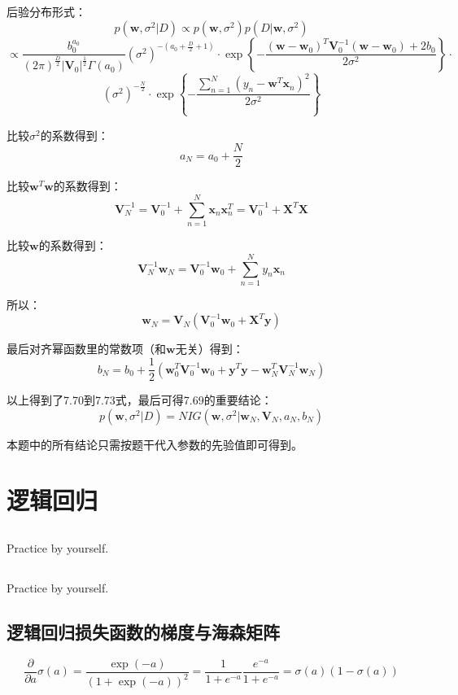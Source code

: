 \documentclass[UTF8]{ctexart}
\begin{document}
后验分布形式：
$$p(\textbf{w},\sigma^{2}|D) \propto p(\textbf{w},\sigma^{2})p(D|\textbf{w},\sigma^{2})$$
$$\propto \frac{b_{0}^{a_{0}}}{(2\pi)^{\frac{D}{2}}|\textbf{V}_{0}|^{\frac{1}{2}}\Gamma(a_{0})}(\sigma^{2})^{-(a_{0}+\frac{D}{2}+1)}\cdot\exp\left\{ -\frac{(\textbf{w}-\textbf{w}_{0})^{T}\textbf{V}_{0}^{-1}(\textbf{w}-\textbf{w}_{0})+2b_{0}}{2\sigma^{2}} \right\} \cdot$$
$$(\sigma^{2})^{-\frac{N}{2}}\cdot \exp\left\{ -\frac{\sum_{n=1}^{N}(y_{n}-\textbf{w}^{T}\textbf{x}_{n})^{2}}{2\sigma^{2}}  \right\}$$

比较$\sigma^{2}$的系数得到：
$$a_{N}=a_{0}+\frac{N}{2}$$

比较$\textbf{w}^{T}\textbf{w}$的系数得到：
$$\textbf{V}_{N}^{-1}=\textbf{V}_{0}^{-1}+\sum_{n=1}^{N}\textbf{x}_{n}\textbf{x}_{n}^{T}=\textbf{V}_{0}^{-1}+\textbf{X}^{T}\textbf{X}$$

比较$\textbf{w}$的系数得到：
$$\textbf{V}_{N}^{-1}\textbf{w}_{N}=\textbf{V}_{0}^{-1}\textbf{w}_{0}+\sum_{n=1}^{N}y_{n}\textbf{x}_{n}$$

所以：
$$\textbf{w}_{N}=\textbf{V}_{N}(\textbf{V}_{0}^{-1}\textbf{w}_{0}+\textbf{X}^{T}\textbf{y})$$

最后对齐幂函数里的常数项（和$\textbf{w}$无关）得到：
$$b_{N}=b_{0}+\frac{1}{2}(\textbf{w}_{0}^{T}\textbf{V}_{0}^{-1}\textbf{w}_{0}+\textbf{y}^{T}\textbf{y}-\textbf{w}_{N}^{T}\textbf{V}_{N}^{-1}\textbf{w}_{N})$$

以上得到了7.70到7.73式，最后可得7.69的重要结论：
$$p(\textbf{w},\sigma^{2}|D)=NIG(\textbf{w},\sigma^{2}|\textbf{w}_{N},\textbf{V}_{N},a_{N},b_{N})$$

本题中的所有结论只需按题干代入参数的先验值即可得到。

\newpage
\section{逻辑回归}
\subsection{}
Practice by yourself.

\subsection{}
Practice by yourself.

\subsection{逻辑回归损失函数的梯度与海森矩阵}
$$\frac{\partial}{\partial a} \sigma(a) = \frac{\exp(-a)}{(1+\exp(-a))^{2}} = \frac{1}{1+e^{-a}}\frac{e^{-a}}{1+e^{-a}}=\sigma(a)(1-\sigma(a))$$
\end{document}
